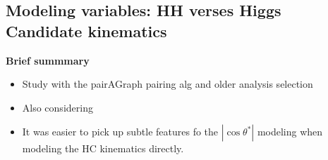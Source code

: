 \subsection{Modeling variables: HH verses Higgs Candidate kinematics}
\label{app:modeling-vars}

\textbf{Brief summmary}
\begin{itemize}
	\item Study with the pairAGraph pairing alg and older analysis selection
	\item Also considering
	\item It was easier to pick up subtle features fo the $|\cos \theta^*|$ modeling when modeling the HC kinematics directly.
\end{itemize}